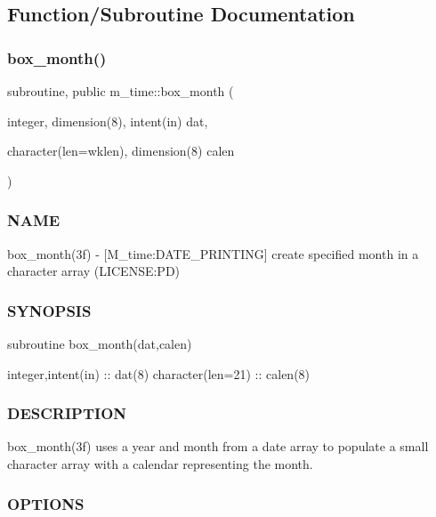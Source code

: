 \subsection{Function/\+Subroutine Documentation}
\mbox{\label{namespacem__time_a0fe7540912df30d3578f3c469413aea8}} 
\subsubsection{\texorpdfstring{box\+\_\+month()}{box\_month()}}
{\footnotesize\ttfamily subroutine, public m\+\_\+time\+::box\+\_\+month (\begin{DoxyParamCaption}\item[{integer, dimension(8), intent(in)}]{dat,  }\item[{character(len=wklen), dimension(8)}]{calen }\end{DoxyParamCaption})}



\subsubsection*{N\+A\+ME}

box\+\_\+month(3f) -\/ \mbox{[}M\+\_\+time\+:D\+A\+T\+E\+\_\+\+P\+R\+I\+N\+T\+I\+NG\mbox{]} create specified month in a character array (L\+I\+C\+E\+N\+SE\+:PD) 

\subsubsection*{S\+Y\+N\+O\+P\+S\+IS}

\begin{DoxyVerb}subroutine box_month(dat,calen)

 integer,intent(in)    :: dat(8)
 character(len=21)     :: calen(8)
\end{DoxyVerb}


\subsubsection*{D\+E\+S\+C\+R\+I\+P\+T\+I\+ON}

box\+\_\+month(3f) uses a year and month from a date array to populate a small character array with a calendar representing the month.

\subsubsection*{O\+P\+T\+I\+O\+NS}

